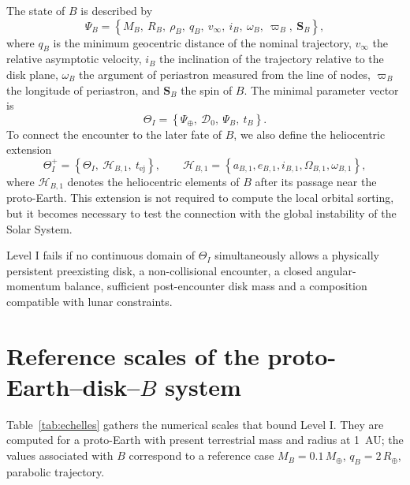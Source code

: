 \documentclass[11pt,a4paper,openany]{report}
\newcommand{\Mt}{M_{\oplus}}
\newcommand{\Rt}{R_{\oplus}}
\begin{document}
The state of $B$ is described by
\begin{equation}
\Psi_B=\left\{M_B,\ R_B,\ \rho_B,\ q_B,\ v_\infty,\ i_B,\ \omega_B,\ \varpi_B,\ \mathbf{S}_B\right\},
\label{eq:PsiB}
\end{equation}
where $q_B$ is the minimum geocentric distance of the nominal trajectory, $v_\infty$ the relative
asymptotic velocity, $i_B$ the inclination of the trajectory relative to the disk plane, $\omega_B$
the argument of periastron measured from the line of nodes, $\varpi_B$ the longitude of
periastron, and $\mathbf{S}_B$ the spin of $B$. The minimal parameter vector is
\begin{equation}
\Theta_I=\left\{\Psi_\oplus,\ \mathcal{D}_0,\ \Psi_B,\ t_B\right\}.
\label{eq:Theta}
\end{equation}
To connect the encounter to the later fate of $B$, we also define the heliocentric extension
\begin{equation}
\Theta_I^{+}=\left\{\Theta_I,\ \mathcal{H}_{B,1},\ t_{\mathrm{ej}}\right\},
\qquad
\mathcal{H}_{B,1}=\left\{a_{B,1},e_{B,1},i_{B,1},\Omega_{B,1},\omega_{B,1}\right\},
\label{eq:Theta-plus}
\end{equation}
where $\mathcal{H}_{B,1}$ denotes the heliocentric elements of $B$ after its passage near the
proto-Earth. This extension is not required to compute the local orbital sorting, but it becomes
necessary to test the connection with the global instability of the Solar System.

\begin{falsif}
Level I fails if no continuous domain of $\Theta_I$ simultaneously allows a physically persistent
preexisting disk, a non-collisional encounter, a closed angular-momentum balance, sufficient
post-encounter disk mass and a composition compatible with lunar constraints.
\end{falsif}

\section{Reference scales of the proto-Earth--disk--\texorpdfstring{$B$}{B} system}

Table~\ref{tab:echelles} gathers the numerical scales that bound Level I. They are computed for a
proto-Earth with present terrestrial mass and radius at 1~AU; the values associated with $B$
correspond to a reference case $M_B=0.1\,\Mt$, $q_B=2\,\Rt$, parabolic trajectory.
\end{document}
